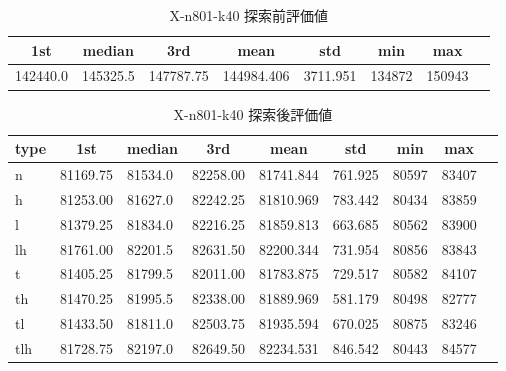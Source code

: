 \begin{table}[htbp]
    \caption{X-n801-k40 探索前評価値}
    \begin{tabular}{|l|l|l|l|l|l|l|l|}\hline
    \multicolumn{1}{|c|}{\textbf{1st}}
    &\multicolumn{1}{c|}{\textbf{median}}
    &\multicolumn{1}{c|}{\textbf{3rd}}
    &\multicolumn{1}{c|}{\textbf{mean}}
    &\multicolumn{1}{c|}{\textbf{std}}
    &\multicolumn{1}{c|}{\textbf{min}}
    &\multicolumn{1}{c|}{\textbf{max}}\\\hline
	142440.0 & 145325.5 & 147787.75 & 144984.406 & 3711.951 & 134872 & 150943\\\hline
	\end{tabular}
\end{table}
\begin{table}[htbp]
    \caption{X-n801-k40 探索後評価値}
    \begin{tabular}{|l|l|l|l|l|l|l|l|l|}\hline
    \multicolumn{1}{|c|}{\textbf{type}}
    &\multicolumn{1}{|c|}{\textbf{1st}}
    &\multicolumn{1}{c|}{\textbf{median}}
    &\multicolumn{1}{c|}{\textbf{3rd}}
    &\multicolumn{1}{c|}{\textbf{mean}}
    &\multicolumn{1}{c|}{\textbf{std}}
    &\multicolumn{1}{c|}{\textbf{min}}
    &\multicolumn{1}{c|}{\textbf{max}}\\\hline
	n & 81169.75 & 81534.0 & 82258.00 & 81741.844 & 761.925 & 80597 & 83407\\\hline
	h & 81253.00 & 81627.0 & 82242.25 & 81810.969 & 783.442 & 80434 & 83859\\\hline
	l & 81379.25 & 81834.0 & 82216.25 & 81859.813 & 663.685 & 80562 & 83900\\\hline
	lh & 81761.00 & 82201.5 & 82631.50 & 82200.344 & 731.954 & 80856 & 83843\\\hline
	t & 81405.25 & 81799.5 & 82011.00 & 81783.875 & 729.517 & 80582 & 84107\\\hline
	th & 81470.25 & 81995.5 & 82338.00 & 81889.969 & 581.179 & 80498 & 82777\\\hline
	tl & 81433.50 & 81811.0 & 82503.75 & 81935.594 & 670.025 & 80875 & 83246\\\hline
	tlh & 81728.75 & 82197.0 & 82649.50 & 82234.531 & 846.542 & 80443 & 84577\\\hline
	\end{tabular}
\end{table}
